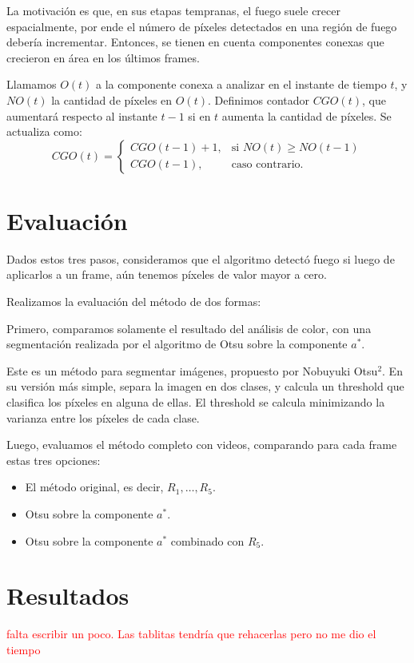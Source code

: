 \documentclass[a4paper]{article}
\begin{document}
La motivación es que, en sus etapas tempranas, el fuego suele crecer espacialmente, por ende el número de píxeles detectados en una región de fuego debería incrementar. Entonces, se tienen en cuenta componentes conexas que crecieron en área en los últimos frames.

Llamamos $O(t)$ a la componente conexa a analizar en el instante de tiempo $t$, y $NO(t)$ la cantidad de píxeles en $O(t)$. Definimos contador $CGO(t)$, que aumentará respecto al instante $t-1$ si en $t$ aumenta la cantidad de píxeles. Se actualiza como:
\[
CGO(t) =
    \begin{cases}
        CGO(t-1) + 1, & \text{si } NO(t) \geq NO(t-1) \\
        CGO(t-1), & \text{caso contrario.}
    \end{cases}
\]
 

\section{Evaluación}
Dados estos tres pasos, consideramos que el algoritmo detectó fuego si luego de aplicarlos a un frame, aún tenemos píxeles de valor mayor a cero.

Realizamos la evaluación del método de dos formas:

Primero, comparamos solamente el resultado del análisis de color, con una segmentación realizada por el algoritmo de Otsu sobre la componente $a^*$. 

Este es un método para segmentar imágenes, propuesto por Nobuyuki Otsu$^2$. En su versión más simple, separa la imagen en dos clases, y calcula un threshold que clasifica los píxeles en alguna de ellas. El threshold se calcula minimizando la varianza entre los píxeles de cada clase.

Luego, evaluamos el método completo con videos, comparando para cada frame estas tres opciones:
\begin{itemize}
    \item El método original, es decir, $R_1, \dots, R_5$.
    \item Otsu sobre la componente $a^*$.
    \item Otsu sobre la componente $a^*$ combinado con $R_5$.
\end{itemize}
  
 
 
\section{Resultados}
\textcolor{red}{falta escribir un poco. Las tablitas tendría que rehacerlas pero no me dio el tiempo}
\end{document}
